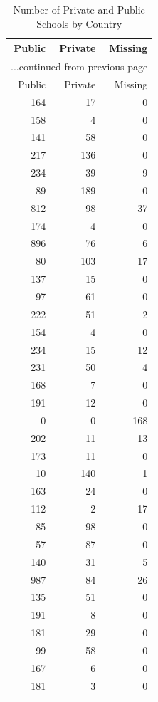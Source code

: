 \documentclass[nojss]{jss}
\begin{document}
\begin{longtable}{rrr}
\caption{Number of Private and Public Schools by Country} \\ 
  \hline
  Public & Private & Missing \\ \endfirsthead \multicolumn{3}{l}{{...continued from previous page}}\\ \hline Public & Private & Missing  \\ \hline \endhead \hline
164 &  17 &   0 \\ 
  158 &   4 &   0 \\ 
  141 &  58 &   0 \\ 
  217 & 136 &   0 \\ 
  234 &  39 &   9 \\ 
   89 & 189 &   0 \\ 
  812 &  98 &  37 \\ 
  174 &   4 &   0 \\ 
  896 &  76 &   6 \\ 
   80 & 103 &  17 \\ 
  137 &  15 &   0 \\ 
   97 &  61 &   0 \\ 
  222 &  51 &   2 \\ 
  154 &   4 &   0 \\ 
  234 &  15 &  12 \\ 
  231 &  50 &   4 \\ 
  168 &   7 &   0 \\ 
  191 &  12 &   0 \\ 
    0 &   0 & 168 \\ 
  202 &  11 &  13 \\ 
  173 &  11 &   0 \\ 
   10 & 140 &   1 \\ 
  163 &  24 &   0 \\ 
  112 &   2 &  17 \\ 
   85 &  98 &   0 \\ 
   57 &  87 &   0 \\ 
  140 &  31 &   5 \\ 
  987 &  84 &  26 \\ 
  135 &  51 &   0 \\ 
  191 &   8 &   0 \\ 
  181 &  29 &   0 \\ 
   99 &  58 &   0 \\ 
  167 &   6 &   0 \\ 
  181 &   3 &   0 \\ 

\end{longtable}
\end{document}
